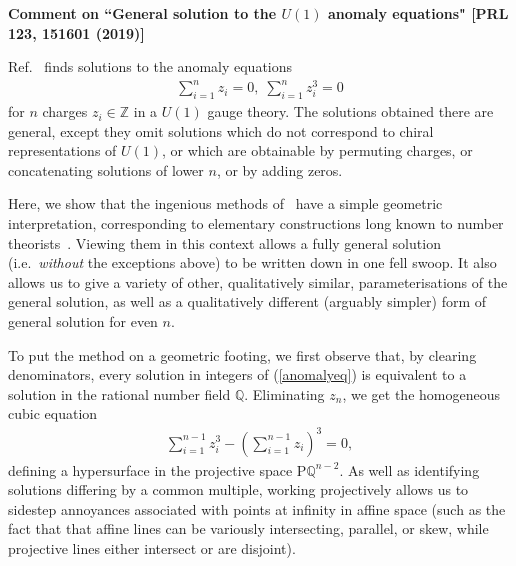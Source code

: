 \documentclass[prl,reprint,amsmath,amssymb,notitlepage]{revtex4-1}
\newcommand{\Z}{\mathbb{Z}}
\newcommand{\Q}{\mathbb{Q}}
\begin{document}
\textbf{Comment on ``General solution to the $U(1)$ anomaly equations" [PRL 123, 151601 (2019)]}

Ref.~\cite{Costa_Dobrescu_Fox_2019} finds 
solutions to the anomaly equations
\begin{align}\label{anomalyeq}
\sum_{i=1}^n z_i=0,\; \sum_{i=1}^n z_i^3=0
\end{align}
 for $n$ charges $z_i
\in \Z$ in a $U(1)$
gauge theory.
The solutions obtained there are general, except they omit solutions which
do not correspond to chiral representations of $U(1)$, or which are
obtainable by permuting charges, or concatenating solutions of lower
$n$, or by adding zeros.  

Here, we show that the ingenious methods of~\cite{Costa_Dobrescu_Fox_2019} have a simple geometric interpretation,
corresponding to elementary constructions long
known to number theorists~\cite{Mordell_1969}.
Viewing them in this context allows a fully general solution
(i.e.\ {\em without}\/ the exceptions above)
to be written
down in one 
fell swoop. It also allows us to give a variety of other,
qualitatively similar,
parameterisations of the general solution, as well as a qualitatively
different (arguably simpler) form of general solution for even $n$. 

To put the method on a geometric footing, we first observe that, by
clearing denominators, every
solution in integers of (\ref{anomalyeq}) is equivalent to a
solution in the rational number field $\Q$. Eliminating $z_n$, we get
the homogeneous cubic equation
\begin{gather} \label{cubichyper}
\sum_{i=1}^{n-1} z_i^3-\left(\sum_{i=1}^{n-1} z_i\right)^3=0,
\end{gather} 
defining a hypersurface in the projective space
$\mathrm{P}\mathbb{Q}^{n-2}$. As well as identifying solutions
differing by a common multiple, working projectively allows us to
sidestep annoyances associated with points at infinity in affine space
(such as the fact that that affine lines
can be variously intersecting, parallel, or skew, while projective lines either
intersect or are disjoint).
\end{document}
